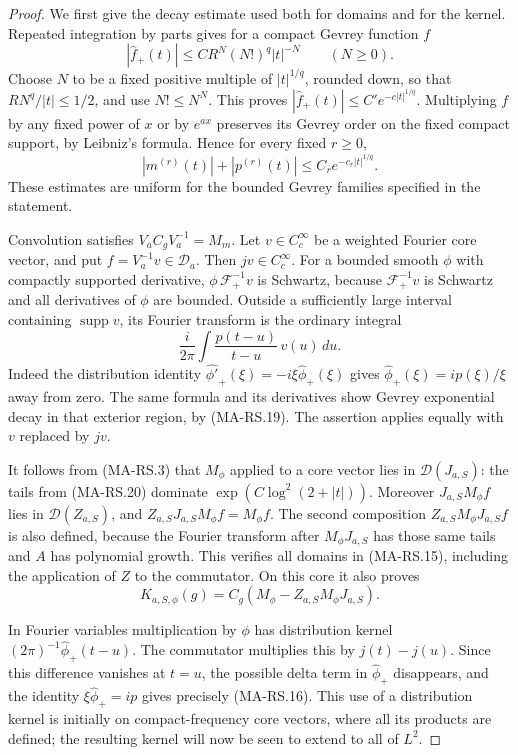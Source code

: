 \begin{proof}
We first give the decay estimate used both for domains
and for the kernel.  Repeated integration by parts gives
for a compact Gevrey function $f$
\[
       |\widehat f_+(t)|
          \le C R^N(N!)^q|t|^{-N}\qquad(N\ge0).
 \tag{MA-RS.18}
\]
Choose $N$ to be a fixed positive multiple of
$|t|^{1/q}$, rounded down, so that
$R N^q/|t|\le1/2$, and use $N!\le N^N$.
This proves $|\widehat f_+(t)|\le C'e^{-c|t|^{1/q}}$.
Multiplying $f$ by any fixed power of $x$ or by $e^{ax}$
preserves its Gevrey order on the fixed compact support,
by Leibniz's formula.  Hence for every fixed $r\ge0$,
\[
          |m^{(r)}(t)|+|p^{(r)}(t)|
                 \le C_r e^{-c_r|t|^{1/q}}.
 \tag{MA-RS.19}
\]
These estimates are uniform for the bounded Gevrey
families specified in the statement.

Convolution satisfies $V_a C_gV_a^{-1}=M_m$.
Let $v\in C_c^\infty$ be a weighted Fourier core vector,
and put $f=V_a^{-1}v\in\mathscr D_a$.
Then $jv\in C_c^\infty$.
For a bounded smooth $\phi$ with compactly supported
derivative, $\phi\,\mathcal F_+^{-1}v$ is Schwartz,
because $\mathcal F_+^{-1}v$ is Schwartz and all
derivatives of $\phi$ are bounded.
Outside a sufficiently large interval containing
$\operatorname{supp}v$, its Fourier transform is the
ordinary integral
\[
    \frac{i}{2\pi}\int
                 \frac{p(t-u)}{t-u}\,v(u)\,du .
 \tag{MA-RS.20}
\]
Indeed the distribution identity
$\widehat{\phi'}_+(\xi)=-i\xi\widehat\phi_+(\xi)$
gives $\widehat\phi_+(\xi)=i p(\xi)/\xi$
away from zero.  The same formula and its derivatives
show Gevrey exponential decay in that exterior region,
by (MA-RS.19).  The assertion applies equally with
$v$ replaced by $jv$.

It follows from (MA-RS.3) that $M_\phi$ applied to a
core vector lies in $\mathcal D(J_{a,S})$:
the tails from (MA-RS.20) dominate
$\exp(C\log^2(2+|t|))$.
Moreover $J_{a,S}M_\phi f$ lies in
$\mathcal D(Z_{a,S})$, and $Z_{a,S}J_{a,S}M_\phi f=M_\phi f$.
The second composition $Z_{a,S}M_\phi J_{a,S}f$
is also defined, because the Fourier transform after
$M_\phi J_{a,S}$ has those same tails and $A$
has polynomial growth.  This verifies all domains in
(MA-RS.15), including the application of $Z$ to the
commutator.  On this core it also proves
\[
       K_{a,S,\phi}(g)
          =C_g(M_\phi-Z_{a,S}M_\phi J_{a,S}).
 \tag{MA-RS.21}
\]

In Fourier variables multiplication by $\phi$ has
distribution kernel $(2\pi)^{-1}\widehat\phi_+(t-u)$.
The commutator multiplies this by $j(t)-j(u)$.
Since this difference vanishes at $t=u$, the possible
delta term in $\widehat\phi_+$ disappears, and the
identity $\xi\widehat\phi_+=i p$ gives precisely
(MA-RS.16).  This use of a distribution kernel is
initially on compact-frequency core vectors, where
all its products are defined; the resulting kernel
will now be seen to extend to all of $L^2$.


\end{proof}
